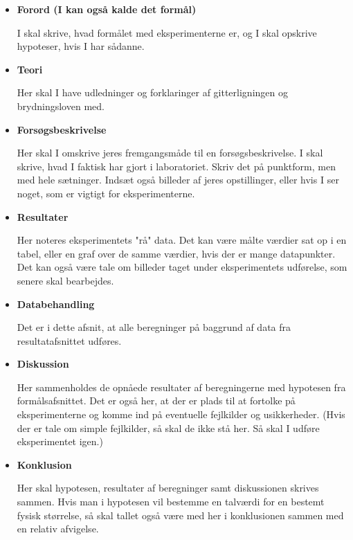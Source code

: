 \documentclass[a4paper, 12pt]{article}
\begin{document}
\begin{itemize}
\item \textbf{Forord (I kan også kalde det formål)}

I skal skrive, hvad formålet med eksperimenterne er, og I skal opskrive hypoteser, hvis I har sådanne.

\item \textbf{Teori}

Her skal I have udledninger og forklaringer af gitterligningen og brydningsloven med.

\item \textbf{Forsøgsbeskrivelse}

Her skal I omskrive jeres fremgangsmåde til en forsøgsbeskrivelse. I skal skrive, hvad I faktisk har gjort i laboratoriet. Skriv det på punktform, men med hele sætninger. Indsæt også billeder af jeres opstillinger, eller hvis I ser noget, som er vigtigt for eksperimenterne.

\item \textbf{Resultater}

Her noteres eksperimentets "rå" data. Det kan være målte værdier sat op i en tabel, eller en graf over de samme værdier, hvis der er mange datapunkter. Det kan også være tale om billeder taget under eksperimentets udførelse, som senere skal bearbejdes.

\item \textbf{Databehandling}

Det er i dette afsnit, at alle beregninger på baggrund af data fra resultatafsnittet udføres.

\item \textbf{Diskussion}

Her sammenholdes de opnåede resultater af beregningerne med hypotesen fra formålsafsnittet. Det er også her, at der er plads til at fortolke på eksperimenterne og komme ind på eventuelle fejlkilder og usikkerheder. (Hvis der er tale om simple fejlkilder, så skal de ikke stå her. Så skal I udføre eksperimentet igen.)

\item \textbf{Konklusion}

Her skal hypotesen, resultater af beregninger samt diskussionen skrives sammen. Hvis man i hypotesen vil bestemme en talværdi for en bestemt fysisk størrelse, så skal tallet også være med her i konklusionen sammen med en relativ afvigelse.
\end{itemize}
\end{document}
